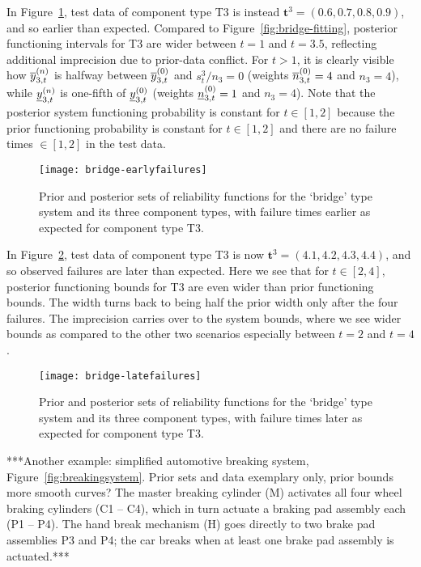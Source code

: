 \documentclass[12pt, a4paper]{elsarticle}
\newcommand{\bs}[1]{\boldsymbol{#1}}
\renewcommand{\vec}[1]{{\bs#1}}
\begin{document}
In Figure~\ref{fig:bridge-early},
test data of component type T3 is instead $\vec{t}^3 = (0.6, 0.7, 0.8, 0.9)$,
and so earlier than expected.
Compared to Figure~\ref{fig:bridge-fitting},
posterior functioning intervals for T3 are wider between $t=1$ and $t=3.5$,
reflecting additional imprecision due to prior-data conflict.
For $t > 1$, it is clearly visible how $\overline{y}^{(n)}_{3,t}$ is halfway between $\overline{y}^{(0)}_{3,t}$ and $s_t^3/n_3 = 0$
(weights $\overline{n}^{(0)}_{3,t} = 4$ and $n_3 = 4$),
while $\underline{y}^{(n)}_{3,t}$ is one-fifth of $\underline{y}^{(0)}_{3,t}$
(weights $\underline{n}^{(0)}_{3,t} = 1$ and $n_3 = 4$).
Note that the posterior system functioning probability is constant for $t \in [1,2]$
because the prior functioning probability is constant for $t \in [1,2]$
and there are no failure times $\in [1,2]$ in the test data.

\begin{figure}
\texttt{[image: bridge-earlyfailures]}
\caption{Prior and posterior sets of reliability functions for the `bridge' type system and its three component types,
with failure times earlier as expected for component type T3.}
\label{fig:bridge-early}
\end{figure}

In Figure~\ref{fig:bridge-late}, 
test data of component type T3 is now $\vec{t}^3 = (4.1, 4.2, 4.3, 4.4)$,
and so observed failures are later than expected.
Here we see that for $t \in [2,4]$,
posterior functioning bounds for T3 are even wider than prior functioning bounds.
The width turns back to being half the prior width
only after the four failures.
The imprecision carries over to the system bounds,
where we see wider bounds as compared to the other two scenarios
especially between $t=2$ and $t=4$.

\begin{figure}
\texttt{[image: bridge-latefailures]}
\caption{Prior and posterior sets of reliability functions for the `bridge' type system and its three component types,
with failure times later as expected for component type T3.}
\label{fig:bridge-late}
\end{figure}

***Another example: simplified automotive breaking system, Figure~\ref{fig:breakingsystem}.
Prior sets and data exemplary only, prior bounds more smooth curves?
The master breaking cylinder (M) activates all four wheel braking cylinders (C1 -- C4),
which in turn actuate a braking pad assembly each (P1 -- P4).
The hand break mechanism (H) goes directly to two brake pad assemblies P3 and P4;
the car breaks when at least one brake pad assembly is actuated.***
\end{document}
